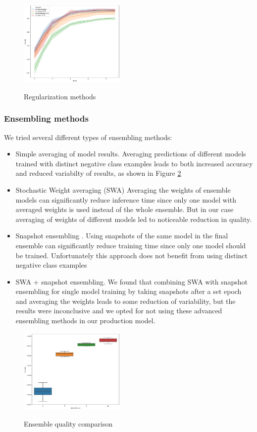 \documentclass[sigconf]{acmart}
\begin{document}
\begin{figure}[ht]
  \caption{Regularization methods}
  \includegraphics[width=0.46\textwidth]{do-pic.png}
  \label{fig-reg}
\end{figure}


\subsubsection{Ensembling methods}

We tried several different types of ensembling methods:
\begin{itemize}
\item Simple averaging of model results. Averaging predictions of different models trained with distinct negative class examples leads to both increased accuracy and reduced variabilty of results, as shown in Figure \ref{fig-ens}
\item Stochastic Weight averaging (SWA) \cite{DBLP:journals/corr/LoshchilovH16a}  Averaging the weights of ensemble models can significantly reduce inference time since only one model with averaged weights is used instead of the whole ensemble. But in our case averaging of weights of different models led to noticeable reduction in quality.
\item Snapshot ensembling \cite{DBLP:journals/corr/HuangLPLHW17}. Using snapshots of the same model in the final ensemble can significantly reduce training time since only one model should be trained. Unfortunately this approach does not benefit from using distinct negative class examples 
\item SWA + snapshot ensembling. We found that combining SWA with snapshot ensembling for single model training by taking snapshots after a set epoch and averaging the weights leads to some reduction of variability, but the results were inconclusive and we opted for not using these advanced ensembling methods in our production model.
\end{itemize}

\begin{figure}[ht]
  \caption{Ensemble quality comparison}
  \includegraphics[width=0.46\textwidth]{ensemble-pic.png}
  \label{fig-ens}
\end{figure}
\end{document}
